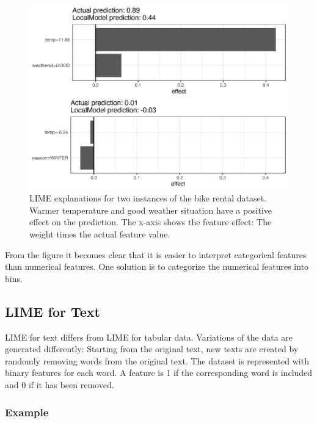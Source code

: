\documentclass[
  12pt,
]{krantz}
\begin{document}
\begin{figure}

{\centering \includegraphics[width=\textwidth]{images/lime-tabular-example-explain-plot-1-1} 

}

\caption{LIME explanations for two instances of the bike rental dataset. Warmer temperature and good weather situation have a positive effect on the prediction. The x-axis shows the feature effect: The weight times the actual feature value.}\label{fig:lime-tabular-example-explain-plot-1}
\end{figure}

From the figure it becomes clear that it is easier to interpret categorical features than numerical features.
One solution is to categorize the numerical features into bins.

\hypertarget{lime-for-text}{%
\subsection{LIME for Text}\label{lime-for-text}}

LIME for text differs from LIME for tabular data.
Variations of the data are generated differently:
Starting from the original text, new texts are created by randomly removing words from the original text.
The dataset is represented with binary features for each word.
A feature is 1 if the corresponding word is included and 0 if it has been removed.

\hypertarget{example-6}{%
\subsubsection{Example}\label{example-6}}
\end{document}
